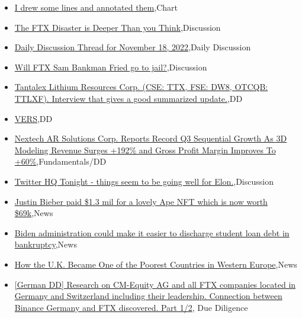 \documentclass{article}%
\begin{document}
%
\begin{itemize}%
\item%
\href{https://reddit.com/r/wallstreetbets/comments/yyj61a/i\_drew\_some\_lines\_and\_annotated\_them/}{I drew some lines and annotated them},Chart%
\item%
\href{https://reddit.com/r/wallstreetbets/comments/yyi2jc/the\_ftx\_disaster\_is\_deeper\_than\_you\_think/}{The FTX Disaster is Deeper Than you Think},Discussion%
\item%
\href{https://reddit.com/r/wallstreetbets/comments/yyhcio/daily\_discussion\_thread\_for\_november\_18\_2022/}{Daily Discussion Thread for November 18, 2022},Daily Discussion%
\item%
\href{https://reddit.com/r/wallstreetbets/comments/yye9i0/will\_ftx\_sam\_bankman\_fried\_go\_to\_jail/}{Will FTX Sam Bankman Fried go to jail?},Discussion%
\item%
\href{https://reddit.com/r/Baystreetbets/comments/yyc6he/tantalex\_lithium\_resources\_corp\_cse\_ttx\_fse\_dw8/}{Tantalex Lithium Resources Corp. (CSE: TTX, FSE: DW8, OTCQB: TTLXF). Interview that gives a good summarized update.},DD%
\item%
\href{https://reddit.com/r/Baystreetbets/comments/yxz55m/vers/}{VERS},DD%
\item%
\href{https://reddit.com/r/StockMarket/comments/yyim1a/nextech\_ar\_solutions\_corp\_reports\_record\_q3/}{Nextech AR Solutions Corp. Reports Record Q3 Sequential Growth As 3D Modeling Revenue Surges +192\% and Gross Profit Margin Improves To +60\%},Fundamentals/DD%
\item%
\href{https://reddit.com/r/StockMarket/comments/yyfv5v/twitter\_hq\_tonight\_things\_seem\_to\_be\_going\_well/}{Twitter HQ Tonight - things seem to be going well for Elon.},Discussion%
\item%
\href{https://reddit.com/r/StockMarket/comments/yyflll/justin\_bieber\_paid\_13\_mil\_for\_a\_lovely\_ape\_nft/}{Justin Bieber paid \$1.3 mil for a lovely Ape NFT which is now worth \$69k},News%
\item%
\href{https://reddit.com/r/Economics/comments/yyf5r5/biden\_administration\_could\_make\_it\_easier\_to/}{Biden administration could make it easier to discharge student loan debt in bankruptcy},News%
\item%
\href{https://reddit.com/r/Economics/comments/yydi8a/how\_the\_uk\_became\_one\_of\_the\_poorest\_countries\_in/}{How the U.K. Became One of the Poorest Countries in Western Europe},News%
\item%
\href{https://reddit.com/r/Superstonk/comments/yyj1gz/german\_dd\_research\_on\_cmequity\_ag\_and\_all\_ftx/}{[German DD] Research on CM-Equity AG and all FTX companies located in Germany and Switzerland including their leadership. Connection between Binance Germany and FTX discovered. Part 1/2}, Due Diligence%
\end{itemize}%
\end{document}
